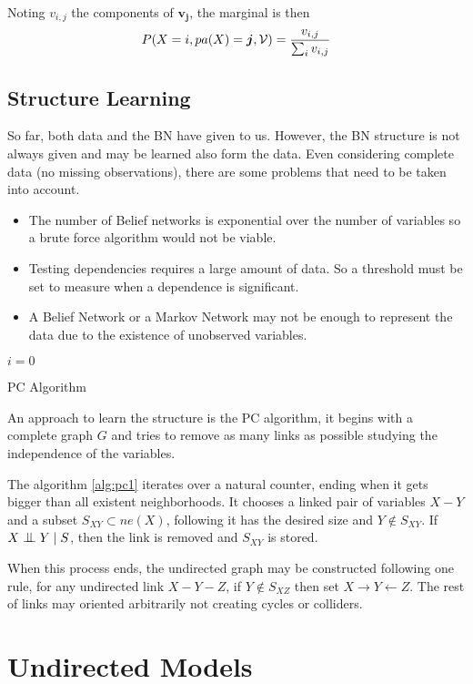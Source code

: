 Noting \(v_{i,j}\) the components of \(\bm{v_{j}}\), the marginal is then
\[
  P(X=i, pa(X) = \bm{j}, \mathcal{V}) = \frac{v_{i,j}}{\sum_{i}v_{i,j}}
\]

\subsection{Structure Learning}

So far, both data and the BN have given to us. However, the BN structure is not
always given and may be learned also form the data. Even considering complete
data (no missing observations), there are some problems that need to be taken
into account.
\begin{itemize}
    \item The number of Belief networks is exponential over the number of
    variables so a brute force algorithm would not be viable.
  \item Testing dependencies requires a large amount of data. So a threshold
    must be set to measure when a dependence is significant.
    \item A Belief Network or a Markov Network may not be enough to represent
    the data due to the existence of unobserved variables.
\end{itemize}


\begin{algorithm}[H]
  \SetAlgoLined
  \(i = 0\)\;
  \caption{PC Algorithm}
  \label{alg:pc1}
\end{algorithm}

An approach to learn the structure is the PC algorithm, it begins with a
complete graph \(G\) and tries to remove as many links as possible studying the
independence of the variables.

The algorithm \ref{alg:pc1} iterates over a natural counter, ending when it gets bigger
than all existent neighborhoods. It chooses a linked pair of variables \(X - Y\) and
a subset \(S_{XY} \subset ne(X)\), following it has the desired size and
\(Y \notin S_{XY}\). If \(X \bigCI Y \mid S\), then the link is removed and \(S_{XY}\) is stored.

When this process ends, the undirected graph may be constructed following one rule,
for any undirected link \(X - Y - Z\), if \(Y \notin S_{XZ}\) then set
\(X \to Y \leftarrow Z\). The rest of links may oriented arbitrarily not
creating cycles or colliders.


\section{Undirected Models}
